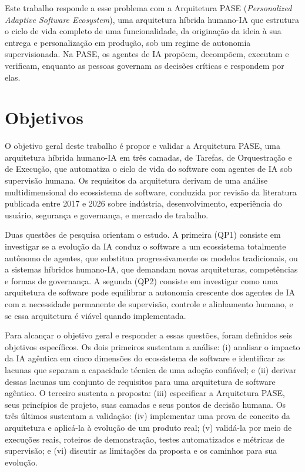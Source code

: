 Este trabalho responde a esse problema com a Arquitetura PASE (\textit{Personalized Adaptive Software Ecosystem}), uma arquitetura híbrida humano-IA que estrutura o ciclo de vida completo de uma funcionalidade, da originação da ideia à sua entrega e personalização em produção, sob um regime de autonomia supervisionada. Na PASE, os agentes de IA propõem, decompõem, executam e verificam, enquanto as pessoas governam as decisões críticas e respondem por elas.

\section{Objetivos}\label{sec:1.2}

O objetivo geral deste trabalho é propor e validar a Arquitetura PASE, uma arquitetura híbrida humano-IA em três camadas, de Tarefas, de Orquestração e de Execução, que automatiza o ciclo de vida do software com agentes de IA sob supervisão humana. Os requisitos da arquitetura derivam de uma análise multidimensional do ecossistema de software, conduzida por revisão da literatura publicada entre 2017 e 2026 sobre indústria, desenvolvimento, experiência do usuário, segurança e governança, e mercado de trabalho.

Duas questões de pesquisa orientam o estudo. A primeira (QP1) consiste em investigar se a evolução da IA conduz o software a um ecossistema totalmente autônomo de agentes, que substitua progressivamente os modelos tradicionais, ou a sistemas híbridos humano-IA, que demandam novas arquiteturas, competências e formas de governança. A segunda (QP2) consiste em investigar como uma arquitetura de software pode equilibrar a autonomia crescente dos agentes de IA com a necessidade permanente de supervisão, controle e alinhamento humano, e se essa arquitetura é viável quando implementada.

Para alcançar o objetivo geral e responder a essas questões, foram definidos seis objetivos específicos. Os dois primeiros sustentam a análise: (i) analisar o impacto da IA agêntica em cinco dimensões do ecossistema de software e identificar as lacunas que separam a capacidade técnica de uma adoção confiável; e (ii) derivar dessas lacunas um conjunto de requisitos para uma arquitetura de software agêntico. O terceiro sustenta a proposta: (iii) especificar a Arquitetura PASE, seus princípios de projeto, suas camadas e seus pontos de decisão humana. Os três últimos sustentam a validação: (iv) implementar uma prova de conceito da arquitetura e aplicá-la à evolução de um produto real; (v) validá-la por meio de execuções reais, roteiros de demonstração, testes automatizados e métricas de supervisão; e (vi) discutir as limitações da proposta e os caminhos para sua evolução.

